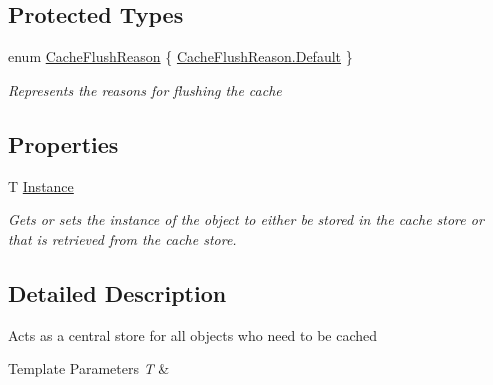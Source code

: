 \subsection*{Protected Types}
\begin{DoxyCompactItemize}
\item 
enum \hyperlink{class_stand_alone_framework_1_1_cache_manager_3_01_t_01_4_ad524db310decad748ac932dfd557e529}{Cache\+Flush\+Reason} \{ \hyperlink{class_stand_alone_framework_1_1_cache_manager_3_01_t_01_4_ad524db310decad748ac932dfd557e529a7a1920d61156abc05a60135aefe8bc67}{Cache\+Flush\+Reason.\+Default}
 \}
\begin{DoxyCompactList}\small\item\em Represents the reasons for flushing the cache \end{DoxyCompactList}\end{DoxyCompactItemize}
\subsection*{Properties}
\begin{DoxyCompactItemize}
\item 
T \hyperlink{class_stand_alone_framework_1_1_cache_manager_3_01_t_01_4_a89d30acfacd8f0272d29c60b87f0be25}{Instance}
\begin{DoxyCompactList}\small\item\em Gets or sets the instance of the object to either be stored in the cache store or that is retrieved from the cache store. \end{DoxyCompactList}\end{DoxyCompactItemize}


\subsection{Detailed Description}
Acts as a central store for all objects who need to be cached 


\begin{DoxyTemplParams}{Template Parameters}
{\em T} & \\
\hline
\end{DoxyTemplParams}


